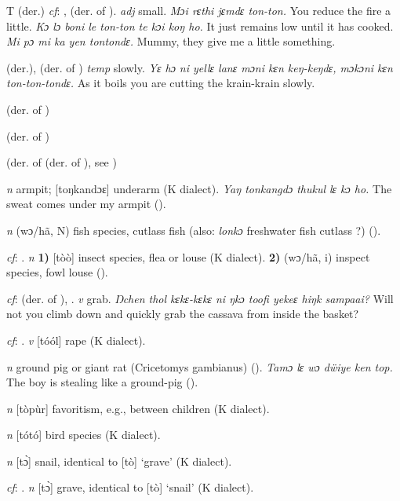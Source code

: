 \begin{letter}{T}
 (der.) \textit{cf}: ,  (der. of ). \textit{adj} small. \textit{Mɔi rɛthi jɛmdɛ ton-ton.} You reduce the fire a little. \textit{Kɔ lɔ boni le ton-ton te kɔi koŋ ho.} It just remains low until it has cooked. \textit{Mi pɔ mi ka yen tontondɛ.} Mummy, they give me a little something.

 (der.), (der. of ) \textit{temp} slowly. \textit{Yɛ hɔ ni yellɛ lanɛ mɔni kɛn keŋ-keŋdɛ, mɔkɔni kɛn ton-ton-tondɛ.} As it boils you are cutting the krain-krain slowly.

 (der. of )

 (der. of ) 

 (der. of  (der. of ), see ) 

 \textit{n} armpit; [toŋkandɔɛ] underarm (K dialect). \textit{Yaŋ tonkangdɔ thukul lɛ kɔ ho.} The sweat comes under my armpit (\citealt{Pichl1967}). 

 \textit{n} (wɔ/hã, N) fish species, cutlass fish (also: \textit{lonkɔ} freshwater fish cutlass ?) (\citealt{Pichl1967}). 

 \textit{cf}: . \textit{n} \textbf{1)} [tòò] insect species, flea or louse (K dialect). \textbf{2)} (wɔ/hã, i) inspect species, fowl louse (\citealt{Pichl1967}). 

 \textit{cf}:  (der. of ), . \textit{v} grab. \textit{Ŋchen thol kɛkɛ-kɛkɛ ni ŋkɔ toofi yekeɛ hiŋk sampaai?} Will not you climb down and quickly grab the cassava from inside the basket?

 \textit{cf}: . \textit{v} [tóól] rape (K dialect). 

 \textit{n} ground pig or giant rat (Cricetomys gambianus) (\citealt{Pichl1967}). \textit{Tamɔ lɛ wɔ dẅiye ken top.} The boy is stealing like a ground-pig (\citealt{Pichl1967}). 

 \textit{n} [tòpùr] favoritism, e.g., between children (K dialect).

 \textit{n} [tótó] bird species (K dialect). 


 \textit{n} [tɔ̀] snail, identical to [tò] ‘grave' (K dialect). 

 \textit{cf}: . \textit{n} [tɔ̀] grave, identical to [tò] ‘snail' (K dialect). 


\end{letter}
